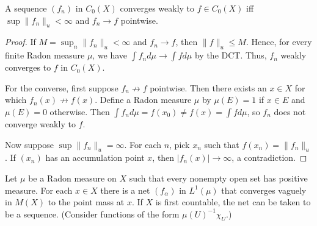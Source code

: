 \documentclass{article}
\begin{document}
 A sequence $(f_n)$ in $C_0(X)$ converges weakly to $f \in C_0(X)$ iff $\sup \|f_n\|_u < \infty$ and
$f_n \to f$ pointwise.
\begin{proof}
If $M = \sup_n \|f_n\|_u < \infty$ and $f_n \to f$,  then $\|f \|_u \le M$.  Hence, for every finite Radon measure $\mu$,
we have $\int f_n d\mu \to \int f d\mu$ by the DCT. Thus, $f_n$ weakly converges to $f$ in $C_0(X)$.

For the converse, first suppose $f_n \not \to f$ pointwise.  Then there exists an $x \in X$ for which
$f_n(x) \not\to f(x)$. Define a Radon measure $\mu$ by $\mu(E) = 1$ if $x \in E$ and $\mu(E) = 0$ otherwise. 
Then $\int f_n d\mu = f(x_0) \neq f(x) = \int f d\mu$, so $f_n$ does not converge weakly to $f$.

Now suppose $\sup \|f_n\|_u = \infty$. For each $n$, pick $x_n$ such that $f(x_n) = \|f_n\|_u$. If $(x_n)$ has an accumulation point $x$,
then $|f_n(x)| \to \infty$, a contradiction. 









\end{proof}


 Let $\mu$ be a Radon measure on $X$ such that every nonempty open set has positive measure. For each 
$x \in X$ there is a net $(f_\alpha)$ in $L^1(\mu)$ that converges vaguely in $M(X)$ to the point mass at $x$. If
$X$ is first countable, the net can be taken to be a sequence. (Consider functions of the form $\mu(U)^{-1} \chi_U$.)
\end{document}
